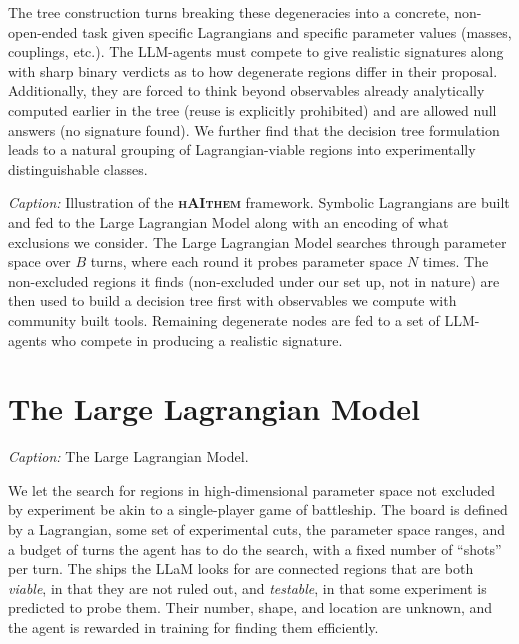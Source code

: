 \documentclass[11pt]{article}
\newcommand{\haithem}{\textbf{\textsc{hAIthem}}}
\newcommand{\interactive}[3][]{%
  \begin{tcolorbox}[colback=orange!5,colframe=orange!60!black,
                    title={Interactive: \texttt{#2}\ifx\relax#1\relax\else\ (#1)\fi}]
  \emph{Caption:} #3
  \end{tcolorbox}}
\newcommand{\figplace}[3][]{%
  \begin{tcolorbox}[colback=blue!4,colframe=blue!40!black,
                    title={Figure: \texttt{#2}\ifx\relax#1\relax\else\ (#1)\fi}]
  \emph{Caption:} #3
  \end{tcolorbox}}
\begin{document}
The tree construction turns breaking these degeneracies into a concrete, non-open-ended task given specific Lagrangians and specific parameter values (masses, couplings, etc.). The LLM-agents must compete to give realistic signatures along with sharp binary verdicts as to how degenerate regions differ in their proposal. Additionally, they are forced to think beyond observables already analytically computed earlier in the tree (reuse is explicitly prohibited) and are allowed null answers (no signature found). We further find that the decision tree formulation leads to a natural grouping of Lagrangian-viable regions into experimentally distinguishable classes.

\interactive{overview}{Illustration of the \haithem{} framework. Symbolic Lagrangians are built and fed to the Large Lagrangian Model along with an encoding of what exclusions we consider. The Large Lagrangian Model searches through parameter space over $B$ turns, where each round it probes parameter space $N$ times. The non-excluded regions it finds (non-excluded under our set up, not in nature) are then used to build a decision tree first with observables we compute with community built tools. Remaining degenerate nodes are fed to a set of LLM-agents who compete in producing a realistic signature.}

\section{The Large Lagrangian Model}



\figplace[wide]{fig-token-architecture-pretrain}{The Large Lagrangian Model.}
We let the search for regions in high-dimensional parameter space not excluded by experiment be akin to a single-player game of battleship. The board is defined by a Lagrangian, some set of experimental
cuts, the parameter space ranges, and a budget of turns the agent has to do the search, with a fixed number of “shots” per turn. The ships the LLaM looks for are connected regions that are both \textit{viable}, in that they are not ruled out, and \textit{testable}, in that some experiment is predicted to probe them. Their number, shape, and location are unknown, and the agent is rewarded in training for finding them efficiently.
\end{document}
